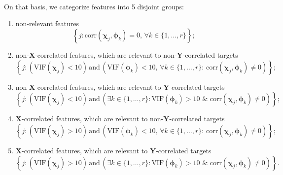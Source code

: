 \documentclass[12pt,twoside]{article}
\newcommand{\bY}{\mathbf{Y}}
\newcommand{\bX}{\mathbf{X}}
\newcommand{\bchi}{\boldsymbol{\chi}}
\newcommand{\bphi}{\boldsymbol{\phi}}
\begin{document}
On that basis, we categorize features into 5 disjoint groups:
\begin{enumerate}
	\item non-relevant features
	\[
		\left\{j: \text{corr}(\bchi_j, \bphi_k) = 0, \, \forall k \in \{1, \dots, r\}\right\};
	\]
	\item non-$\bX$-correlated features, which are relevant to non-$\bY$-correlated targets
	\[
		\left\{j: \left(\text{VIF}(\bchi_j) < 10\right) \, \text{and} \, \left(\text{VIF}(\bphi_k) < 10 , \, \forall k \in \{1, \dots, r\}: \,  \text{corr}(\bchi_j, \bphi_k) \neq 0 \right)\right\};
	\]
	\item non-$\bX$-correlated features, which are relevant to $\bY$-correlated targets
	\[
		\left\{j: \left(\text{VIF}(\bchi_j) < 10\right) \, \text{and} \, \left( \exists k \in \{1, \dots, r\}: \text{VIF}(\bphi_k) > 10 \,\, \& \,\, \text{corr}(\bchi_j, \bphi_k) \neq 0 \right)\right\};
	\]
	\item $\bX$-correlated features, which are relevant to non-$\bY$-correlated targets
	\[
		\left\{j: \left(\text{VIF}(\bchi_j) > 10\right) \, \text{and} \, \left(\text{VIF}(\bphi_k) < 10 , \, \forall k \in \{1, \dots, r\}: \,  \text{corr}(\bchi_j, \bphi_k) \neq 0 \right)\right\};
	\]
	\item $\bX$-correlated features, which are relevant to $\bY$-correlated targets
	\[
		\left\{j: \left(\text{VIF}(\bchi_j) > 10\right) \, \text{and} \, \left( \exists k \in \{1, \dots, r\}: \text{VIF}(\bphi_k) > 10 \,\, \& \,\, \text{corr}(\bchi_j, \bphi_k) \neq 0 \right)\right\}.
	\]
\end{enumerate}
\end{document}

